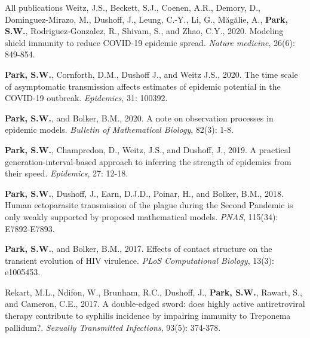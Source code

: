 \documentclass[
	11pt, %
]{resume} %
\begin{document}
\begin{rSection}{All publications}
Weitz, J.S., Beckett, S.J., Coenen, A.R., Demory, D., Dominguez-Mirazo, M., Dushoff, J., Leung, C.-Y., Li, G., Măgălie, A., \textbf{Park, S.W.}, Rodriguez-Gonzalez, R., Shivam, S., and Zhao, C.Y., 2020. Modeling shield immunity to reduce COVID-19 epidemic spread. \textit{Nature medicine}, 26(6): 849-854.

\textbf{Park, S.W.}, Cornforth, D.M., Dushoff J., and Weitz J.S., 2020. The time scale of asymptomatic transmission affects estimates of epidemic potential in the COVID-19 outbreak. \textit{Epidemics}, 31: 100392.

\textbf{Park, S.W.}, and Bolker, B.M., 2020. A note on observation processes in epidemic models. \textit{Bulletin of Mathematical Biology}, 82(3): 1-8.

\textbf{Park, S.W.}, Champredon, D., Weitz, J.S., and Dushoff, J., 2019. A practical generation-interval-based approach to inferring the strength of epidemics from their speed. \textit{Epidemics}, 27: 12-18.

\textbf{Park, S.W.}, Dushoff, J., Earn, D.J.D., Poinar, H., and Bolker, B.M., 2018. Human ectoparasite transmission of the plague during the Second Pandemic is only weakly supported by proposed mathematical models. \textit{PNAS}, 115(34): E7892-E7893.

\textbf{Park, S.W.}, and Bolker, B.M., 2017. Effects of contact structure on the transient evolution of HIV virulence. \textit{PLoS Computational Biology}, 13(3): e1005453.

Rekart, M.L., Ndifon, W., Brunham, R.C., Dushoff, J., \textbf{Park, S.W.}, Rawart, S., and Cameron, C.E., 2017. A double-edged sword: does highly active antiretroviral therapy contribute to syphilis incidence by impairing immunity to Treponema pallidum?. \textit{Sexually Transmitted Infections}, 93(5): 374-378.

\end{rSection}
\end{document}
